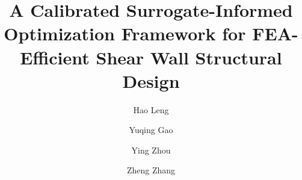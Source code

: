 \documentclass[final,5p,times,twocolumn, fleqn]{elsarticle}
\begin{document}
\setlength{\abovedisplayskip}{5pt}
\setlength{\belowdisplayskip}{5pt}

\begin{frontmatter}



\title{A Calibrated Surrogate-Informed Optimization Framework for FEA-Efficient Shear Wall Structural Design}


\author[aff1]{Hao Leng}
\author[aff1]{Yuqing Gao}
\author[aff1]{Ying Zhou}
\author[aff1,aff2]{Zheng Zhang}

\address[aff1]{State Key Laboratory of Disaster Reduction in Civil Engineering, Tongji University, Shanghai 200092, China}
\address[aff2]{Tongji Architectural Design (Group) Co., Ltd., Shanghai 200092, China}



\end{frontmatter}
\end{document}
